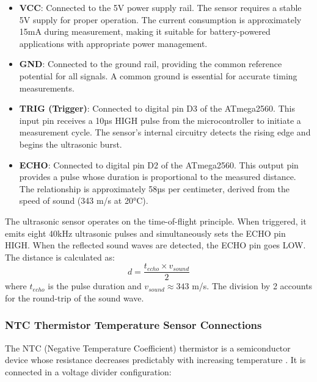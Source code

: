 \begin{itemize}
    \item \textbf{VCC}: Connected to the 5V power supply rail. The sensor requires a stable 5V supply for proper operation. The current consumption is approximately 15mA during measurement, making it suitable for battery-powered applications with appropriate power management.
    \item \textbf{GND}: Connected to the ground rail, providing the common reference potential for all signals. A common ground is essential for accurate timing measurements.
    \item \textbf{TRIG (Trigger)}: Connected to digital pin D3 of the ATmega2560. This input pin receives a 10µs HIGH pulse from the microcontroller to initiate a measurement cycle. The sensor's internal circuitry detects the rising edge and begins the ultrasonic burst.
    \item \textbf{ECHO}: Connected to digital pin D2 of the ATmega2560. This output pin provides a pulse whose duration is proportional to the measured distance. The relationship is approximately 58µs per centimeter, derived from the speed of sound (343 m/s at 20°C).
\end{itemize}

The ultrasonic sensor operates on the time-of-flight principle. When triggered, it emits eight 40kHz ultrasonic pulses and simultaneously sets the ECHO pin HIGH. When the reflected sound waves are detected, the ECHO pin goes LOW. The distance is calculated as:
\begin{equation}
d = \frac{t_{echo} \times v_{sound}}{2}
\end{equation}
where $t_{echo}$ is the pulse duration and $v_{sound} \approx 343$ m/s. The division by 2 accounts for the round-trip of the sound wave.

\subsubsection{NTC Thermistor Temperature Sensor Connections}
The NTC (Negative Temperature Coefficient) thermistor is a semiconductor device whose resistance decreases predictably with increasing temperature \cite{ntc}. It is connected in a voltage divider configuration:

